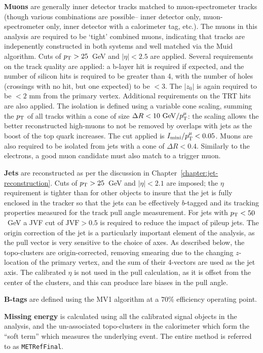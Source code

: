 	\textbf{Muons} are generally inner detector tracks matched to muon-spectrometer tracks (though various combinations are possible-- inner detector only, muon-spectrometer only, inner detector with a calorimeter tag, etc.). The muons in this analysis are required to be `tight' combined muons, indicating that tracks are indepenently constructed in both systems and well matched via the Muid algorithm. Cuts of $p_{\text{T}} > 25$~GeV and $|\eta|<2.5$ are applied. Several requirements on the track quality are applied: a b-layer hit is required if expected, and the number of silicon hits is required to be greater than 4, with the number of holes (crossings with no hit, but one expected) to be $< 3$. The $|z_0|$ is again required to be $< 2$ mm from the primary vertex. Additional requirements on the TRT hits are also applied. The isolation is defined using a variable cone scaling, summing the $p_{\text{T}}$ of all tracks within a cone of size $\Delta R < 10~\mathrm{GeV} / p_{\text{T}}^{\mu}$: the scaling allows the better reconstructed high-\pt muons to not be removed by overlaps with jets as the boost of the top quark increases. The cut applied is $I_\mathrm{mini} / p_{\text{T}}^{\mu} < 0.05 $.  Muons are also required to be isolated from jets with a cone of $\Delta R < 0.4$. Similarly to the electrons, a good muon candidate must also match to a trigger muon.

	\textbf{Jets} are reconstructed as per the discussion in Chapter~\ref{chapter:jet-reconstruction}. Cuts of $p_{\text{T}} > 25$~GeV and $|\eta| < 2.1$ are imposed; the $\eta$ requirement is tighter than for other objects to insure that the jet is fully enclosed in the tracker so that the jets can be effectively $b$-tagged and its tracking properties measured for the track pull angle measurement. For jets with $p_{\text{T}} < 50$~GeV a JVF cut of $\mathrm{JVF} > 0.5$ is required to reduce the impact of pileup jets. The origin correction of the jet is a particularly important element of the analysis, as the pull vector is very sensitive to the choice of axes. As described below, the topo-clusters are origin-corrected, removing smearing due to the changing $z$-location of the primary vertex, and the sum of their 4-vectors are used as the jet axis. The calibrated $\eta$ is not used in the pull calculation, as it is offset from the center of the clusters, and this can produce lare biases in the pull angle.

	\textbf{B-tags} are defined using the MV1 algorithm at a $70\%$ efficiency operating point.

	\textbf{Missing energy} is calculated using all the calibrated signal objects in the analysis, and the un-associated topo-clusters in the calorimeter which form the ``soft term'' which measures the underlying event. The entire method is referred to as \texttt{METRefFinal}. 


